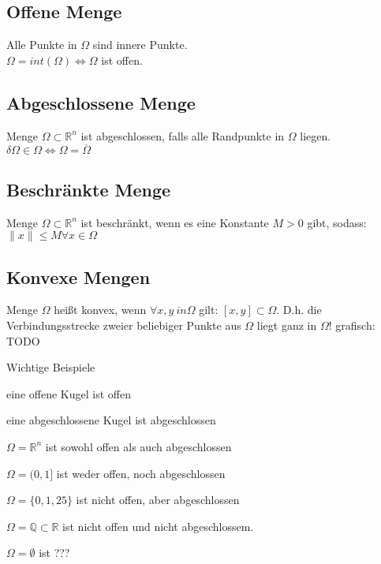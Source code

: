 \documentclass[german]{latex4ei/latex4ei_sheet}
\begin{document}
\begin{sectionbox}
	\subsection*{Offene Menge}
	Alle Punkte in $\Omega$ sind innere Punkte.\\
	$\Omega=int(\Omega) \Leftrightarrow \Omega $ ist offen.\\
	
	\subsection*{Abgeschlossene Menge}
	Menge $\Omega \subset \mathbb{R}^n$ ist abgeschlossen, falls alle Randpunkte in $\Omega$ liegen.\\
	$\delta \Omega \in \Omega \Leftrightarrow \Omega = \overline{\Omega}$
	
	\subsection*{Beschr\"ankte Menge}
	Menge $\Omega \subset \mathbb{R}^n$ ist beschränkt, wenn es eine Konstante $M>0$ gibt, sodass:\\
	$\|x\| \le M     \forall x \in \Omega$\\
	
	\subsection{Konvexe Mengen}
	Menge $\Omega$ hei\ss{}t konvex, wenn $\forall x,y\ in \Omega$ gilt: $[x,y]\subset\Omega$. D.h. die Verbindungsstrecke zweier beliebiger Punkte aus $\Omega$ liegt ganz in $\Omega$!
	grafisch: TODO\\
\end{sectionbox}
	\begin{cookbox}{Wichtige Beispiele}
	\item eine offene Kugel ist offen
	\item eine abgeschlossene Kugel ist abgeschlossen
	\item $\Omega = \mathbb{R}^n$ ist sowohl offen als auch abgeschlossen
	\item $\Omega = (0,1]$ ist weder offen, noch abgeschlossen
	\item $\Omega = \{0,1,25\}$ ist nicht offen, aber abgeschlossen
	\item $\Omega = \mathbb{Q} \subset \mathbb{R}$ ist nicht offen und nicht abgeschlossem.
	\item $\Omega = \emptyset$ ist ???
\end{cookbox}
	
\end{document}
